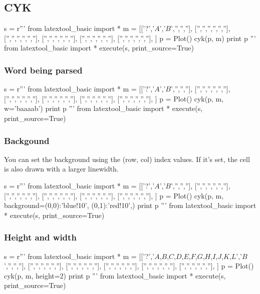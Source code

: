 \subsection{CYK}

\begin{python}
s = r'''
from latextool_basic import *
m = [['?','$A$','$B$','','',''],
     ['','','','','',''],
     ['','','','','',''],
     ['','','','','',''],
     ['','','','','',''],
     ['','','','','',''],
     ]
p = Plot()
cyk(p, m)
print p
'''
from latextool_basic import *
execute(s, print_source=True)
\end{python}


\subsubsection{Word being parsed}
\begin{python}
s = r'''
from latextool_basic import *
m = [['?','$A$','$B$','','',''],
     ['','','','','',''],
     ['','','','','',''],
     ['','','','','',''],
     ['','','','','',''],
     ['','','','','',''],
     ]
p = Plot()
cyk(p, m, w='baaaab')
print p
'''
from latextool_basic import *
execute(s, print_source=True)
\end{python}


\subsubsection{Backgound}
You can set the background using the (row, col)
index values.
If it's set, the cell is also drawn with a larger
linewidth.
\begin{python}
s = r'''
from latextool_basic import *
m = [['?','$A$','$B$','','',''],
     ['','','','','',''],
     ['','','','','',''],
     ['','','','','',''],
     ['','','','','',''],
     ['','','','','',''],
     ]
p = Plot()
cyk(p, m, background={(0,0):'blue!10',
                      (0,1):'red!10',})
print p
'''
from latextool_basic import *
execute(s, print_source=True)
\end{python}



\subsubsection{Height and width}
\begin{python}
s = r'''
from latextool_basic import *
m = [['?','$A$,$B$,$C$,$D$,$E$,$F$,$G$,$H$,$I$,$J$,$K$,$L$','$B$','','',''],
     ['','','','','',''],
     ['','','','','',''],
     ['','','','','',''],
     ['','','','','',''],
     ['','','','','',''],
     ]
p = Plot()
cyk(p, m, height=2)
print p
'''
from latextool_basic import *
execute(s, print_source=True)
\end{python}




